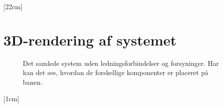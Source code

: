 \eject \pdfpagewidth=420mm \pdfpageheight=297mm
\titlespacing*{\chapter}{1cm}{0cm}{1cm}[22cm]
\chapter{3D-rendering af systemet}
\label{3D}

\begin{figure}[H]
\centering
\vspace{-5mm}
	\caption{Det samlede system uden ledningsforbindelser og forsyninger. Har kan det ses, hvordan de forskellige komponenter er placeret på banen.}
\end{figure}

\eject \pdfpagewidth=210mm \pdfpageheight=297mm
\titlespacing*{\chapter}{1cm}{0cm}{1cm}[1cm]